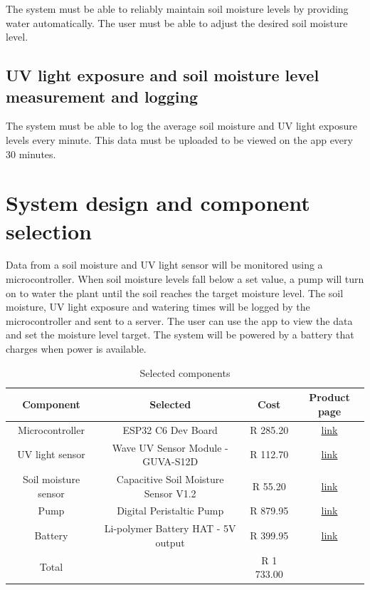 The system must be able to reliably maintain soil moisture levels by providing water automatically. The user must be able to adjust the desired soil moisture level.

\subsection{UV light exposure and soil moisture level
measurement and logging}
The system must be able to log the average soil moisture and \ac{UV} light exposure levels every minute. This data must be uploaded to be viewed on the app every 30 minutes.

\section{System design and component selection}

Data from a soil moisture and \ac{UV} light sensor will be monitored using a microcontroller. When soil moisture levels fall below a set value, a pump will turn on to water the plant until the soil reaches the target moisture level. The soil moisture, \ac{UV} light exposure and watering times will be logged by the microcontroller and sent to a server. The user can use the app to view the data and set the moisture level target. The system will be powered by a battery that charges when power is available.

\begin{table}[!h]
    \centering
    \begin{tabular}{|c|c|c|c|}
        \hline
        Component & Selected & Cost & Product page \\
        \hline
        Microcontroller &  ESP32 C6 Dev Board & R 285.20 & \href{https://www.robotics.org.za/ESP32-C6-DEV}{link} \\
        UV light sensor & Wave UV Sensor Module - GUVA-S12D & R 112.70 & \href{https://www.robotics.org.za/W9537}{link} \\
        Soil moisture sensor & Capacitive Soil Moisture Sensor V1.2 & R 55.20 & \href{https://www.robotics.org.za/CAP-SW-12}{link} \\
        Pump & Digital Peristaltic Pump & R 879.95 & \href{https://www.diyelectronics.co.za/store/dfrobot/2119-digital-peristaltic-pump.html?search_query=PERISTALTIC+PUMP&results=4}{link} \\
        Battery & Li-polymer Battery HAT - 5V output & R 399.95 & \href{https://www.diyelectronics.co.za/store/hats/2726-lipo-battery-hat-5v-output.html?search_query=Li-polymer+Battery+HAT&results=14}{link}\\
        \hline
        Total & & R 1 733.00 & \\
        \hline
    \end{tabular}
    \caption{Selected components}
    \label{tab:components_selected}
\end{table}

